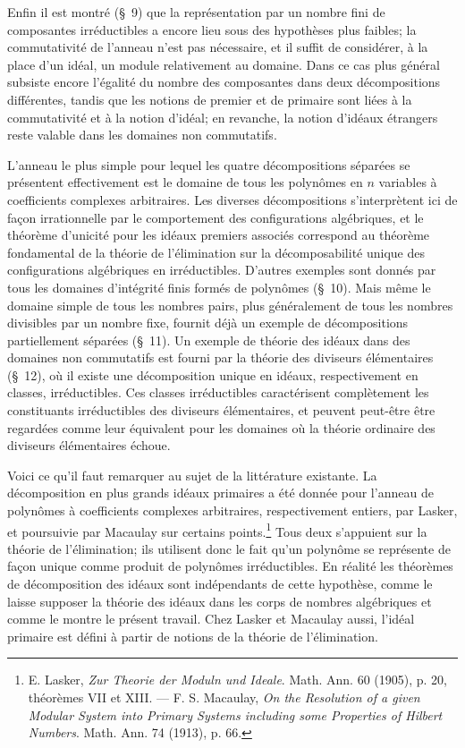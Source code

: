 Enfin il est montré (\S{}~9) que la représentation par un nombre fini de composantes irréductibles a encore lieu sous des hypothèses plus faibles; la commutativité de l'anneau n'est pas nécessaire, et il suffit de considérer, à la place d'un idéal, un module relativement au domaine. Dans ce cas plus général subsiste encore l'égalité du nombre des composantes dans deux décompositions différentes, tandis que les notions de premier et de primaire sont liées à la commutativité et à la notion d'idéal; en revanche, la notion d'idéaux étrangers reste valable dans les domaines non commutatifs.

L'anneau le plus simple pour lequel les quatre décompositions séparées se présentent effectivement est le domaine de tous les polynômes en $n$ variables à coefficients complexes arbitraires. Les diverses décompositions s'interprètent ici de façon irrationnelle par le comportement des configurations algébriques, et le théorème d'unicité pour les idéaux premiers associés correspond au théorème fondamental de la théorie de l'élimination sur la décomposabilité unique des configurations algébriques en irréductibles. D'autres exemples sont donnés par tous les domaines d'intégrité finis formés de polynômes (\S{}~10). Mais même le domaine simple de tous les nombres pairs, plus généralement de tous les nombres divisibles par un nombre fixe, fournit déjà un exemple de décompositions partiellement séparées (\S{}~11). Un exemple de théorie des idéaux dans des domaines non commutatifs est fourni par la théorie des diviseurs élémentaires (\S{}~12), où il existe une décomposition unique en idéaux, respectivement en classes, irréductibles. Ces classes irréductibles caractérisent complètement les constituants irréductibles des diviseurs élémentaires, et peuvent peut-être être regardées comme leur équivalent pour les domaines où la théorie ordinaire des diviseurs élémentaires échoue.

Voici ce qu'il faut remarquer au sujet de la littérature existante. La décomposition en plus grands idéaux primaires a été donnée pour l'anneau de polynômes à coefficients complexes arbitraires, respectivement entiers, par Lasker, et poursuivie par Macaulay sur certains points.\footnote{E. Lasker, \emph{Zur Theorie der Moduln und Ideale}. Math. Ann. 60 (1905), p. 20, théorèmes VII et XIII. --- F. S. Macaulay, \emph{On the Resolution of a given Modular System into Primary Systems including some Properties of Hilbert Numbers}. Math. Ann. 74 (1913), p. 66.} Tous deux s'appuient sur la théorie de l'élimination; ils utilisent donc le fait qu'un polynôme se représente de façon unique comme produit de polynômes irréductibles. En réalité les théorèmes de décomposition des idéaux sont indépendants de cette hypothèse, comme le laisse supposer la théorie des idéaux dans les corps de nombres algébriques et comme le montre le présent travail. Chez Lasker et Macaulay aussi, l'idéal primaire est défini à partir de notions de la théorie de l'élimination.

